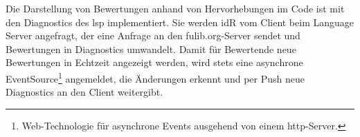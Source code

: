 Die Darstellung von Bewertungen anhand von Hervorhebungen im Code ist mit den Diagnostics des \ac{lsp} implementiert.
Sie werden \ac{idR} vom Client beim Language Server angefragt, der eine Anfrage an den fulib.org-Server sendet und Bewertungen in Diagnostics umwandelt.
Damit für Bewertende neue Bewertungen in Echtzeit angezeigt werden, wird stets eine asynchrone EventSource\footnote{
    Web-Technologie für asynchrone Events ausgehend von einem \ac{http}-Server.
} angemeldet, die Änderungen erkennt und per Push neue Diagnostics an den Client weitergibt.
